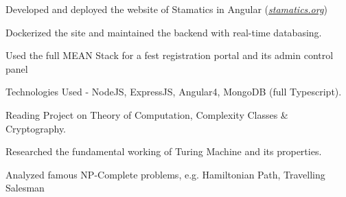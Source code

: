 \documentclass[]{deedy-resume-openfont}
\begin{document}
\begin{minipage}[t]{0.70\textwidth}
\vspace{0.1cm}
\begin{tightemize}
  \item Developed and deployed the website of Stamatics in Angular (\href{http://stamatics.org}{\textit{stamatics.org}})
  \item Dockerized the site and maintained the backend with real-time databasing.
\end{tightemize}
\begin{tightemize}
  \item Used the full MEAN Stack for a fest registration portal and its admin control panel
  \item Technologies Used - NodeJS, ExpressJS, Angular4, MongoDB (full Typescript).
\end{tightemize}

\vspace{0.0cm}
\begin{tightemize}
  \item Reading Project on Theory of Computation, Complexity Classes \& Cryptography.
  \item Researched the fundamental working of Turing Machine and its properties.
  \item Analyzed famous NP-Complete problems, e.g. Hamiltonian Path, Travelling Salesman
\end{tightemize}




\end{minipage}
\end{document}
